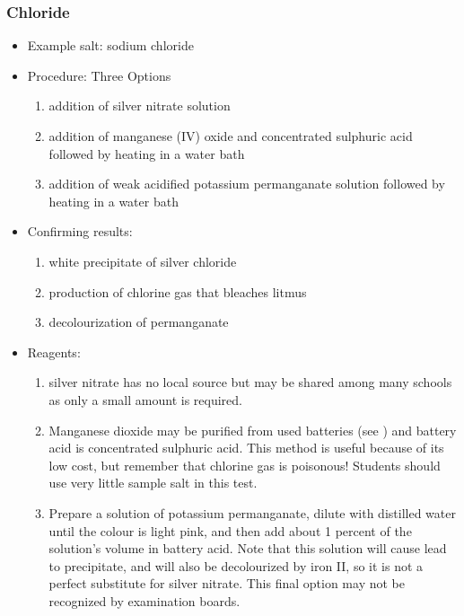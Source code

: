 \subsubsection{Chloride}
\begin{itemize}
\item{Example salt: sodium chloride}
\item{Procedure: Three Options
\begin{enumerate}
\item{addition of silver nitrate solution}
\item{addition of manganese (IV) oxide and concentrated sulphuric acid 
followed by heating in a water bath}
\item{addition of weak acidified potassium permanganate solution 
followed by heating in a water bath}
\end{enumerate}
} %
\item{Confirming results:
\begin{enumerate}
\item{white precipitate of silver chloride} 
\item{production of chlorine gas that bleaches litmus} 
\item{decolourization of permanganate}
\end{enumerate}
} %
\item{Reagents:
\begin{enumerate}
\item{silver nitrate has no local source 
but may be shared among many schools as only a small amount is required.}
\item{Manganese dioxide may be purified from used batteries 
(see ) and battery acid is concentrated sulphuric acid. 
This method is useful because of its low cost, 
but remember that chlorine gas is poisonous! 
Students should use very little sample salt in this test.}
\item{Prepare a solution of potassium permanganate, 
dilute with distilled water until the colour is light pink, 
and then add about 1 percent of the solution's volume in battery acid. 
Note that this solution will cause lead to precipitate, 
and will also be decolourized by iron II, 
so it is not a perfect substitute for silver nitrate. 
This final option may not be recognized by examination boards.}
\end{enumerate}
} %
\end{itemize}

